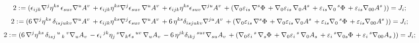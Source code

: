 \documentclass[11pt]{article}
\def\specialcolon{\mathrel{\mathop{:}}\hspace{-.5em}}
\begin{document}
\begin{dmath*}[compact, spread=2pt]
2\specialcolon{}= ({\epsilon}_{i j k} {\nabla}^{j}{{\eta}^{k s}}\,  {\epsilon}_{s u v} {\nabla}^{u}{{A}^{v}}\,  + {\epsilon}_{i j k} {\eta}^{k s} {\nabla}^{j}{{\epsilon}_{s u v}}\,  {\nabla}^{u}{{A}^{v}}\,  + {\epsilon}_{i j k} {\eta}^{k s} {\epsilon}_{s u v} {\nabla}^{j u}{{A}^{v}}\,  + ({\nabla}_{0}{{\varepsilon}_{i s}}\,  {\nabla}^{s}{\Phi}\,  + {\nabla}_{0}{{\varepsilon}_{i s}}\,  {\nabla}_{0}{{A}^{s}}\,  + {\varepsilon}_{i s} {\nabla}_{0}\,^{s}{\Phi}\,  + {\varepsilon}_{i s} {\nabla}_{0 0}{{A}^{s}}\, )) = {J}_{i};
\end{dmath*}
\begin{dmath*}[compact, spread=2pt]
2\specialcolon{}= (6\, {\nabla}^{j}{{\eta}^{k s}}\,  {\delta}_{i s j u k v} {\nabla}^{u}{{A}^{v}}\,  + {\epsilon}_{i j k} {\eta}^{k s} {\nabla}^{j}{{\epsilon}_{s u v}}\,  {\nabla}^{u}{{A}^{v}}\,  + 6\, {\eta}^{k s} {\delta}_{i s j u k v} {\nabla}^{j u}{{A}^{v}}\,  + ({\nabla}_{0}{{\varepsilon}_{i s}}\,  {\nabla}^{s}{\Phi}\,  + {\nabla}_{0}{{\varepsilon}_{i s}}\,  {\nabla}_{0}{{A}^{s}}\,  + {\varepsilon}_{i s} {\nabla}_{0}\,^{s}{\Phi}\,  + {\varepsilon}_{i s} {\nabla}_{0 0}{{A}^{s}}\, )) = {J}_{i};
\end{dmath*}
\begin{dmath*}[compact, spread=2pt]
2\specialcolon{}= (6\, {\nabla}^{j}{{\eta}^{k s}}\,  {\delta}_{i s j}\,^{u}\,_{k}\,^{v} {\nabla}_{u}{{A}_{v}}\,  - {\epsilon}_{i}\,^{j k} {\eta}_{j}\,^{s} {\nabla}_{k}{{\epsilon}_{s}\,^{u v}}\,  {\nabla}_{u}{{A}_{v}}\,  - 6\, {\eta}^{j k} {\delta}_{i k j}\,^{s u v} {\nabla}_{s u}{{A}_{v}}\,  + ({\nabla}_{0}{{\varepsilon}_{i}\,^{s}}\,  {\nabla}_{s}{\Phi}\,  + {\nabla}_{0}{{\varepsilon}_{i}\,^{s}}\,  {\nabla}_{0}{{A}_{s}}\,  + {\varepsilon}_{i}\,^{s} {\nabla}_{0 s}{\Phi}\,  + {\varepsilon}_{i}\,^{s} {\nabla}_{0 0}{{A}_{s}}\, )) = {J}_{i};
\end{dmath*}
\end{document}
